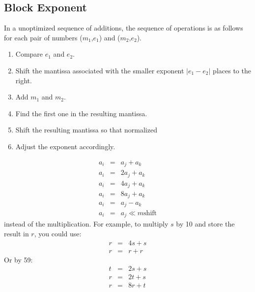 



%


\subsection{Block Exponent}

In a unoptimized sequence of additions, the sequence of operations is as
follows for each pair of numbers ($m_1$,$e_1$) and ($m_2$,$e_2$).
\begin{enumerate}
  \item Compare $e_1$ and $e_2$.
  \item Shift the mantissa associated with the smaller exponent $|e_1-e_2|$
        places to the right.
  \item Add $m_1$ and $m_2$.
  \item Find the first one in the resulting mantissa.
  \item Shift the resulting mantissa so that normalized
  \item Adjust the exponent accordingly.
\end{enumerate}


\begin{eqnarray*}
a_i & = & a_j + a_k \\
a_i & = & 2a_j + a_k \\
a_i & = & 4a_j + a_k \\
a_i & = & 8a_j + a_k \\
a_i & = & a_j - a_k \\
a_i & = & a_j \ll m \mbox{shift}
\end{eqnarray*}
instead of the multiplication.  For example, to multiply $s$ by 10 and store
the result in $r$, you could use:
\begin{eqnarray*}
r & = & 4s + s\\
r & = & r + r
\end{eqnarray*}
Or by 59:
\begin{eqnarray*}
t & = & 2s + s \\
r & = & 2t + s \\
r & = & 8r + t
\end{eqnarray*}

